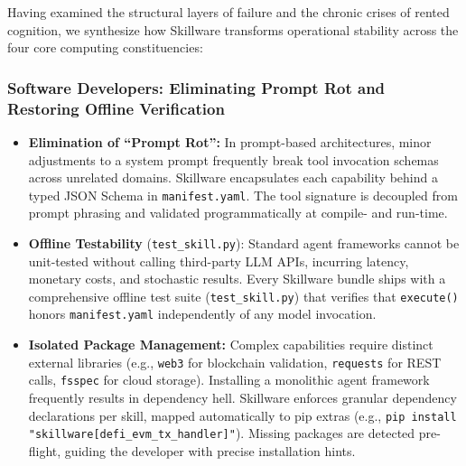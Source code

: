 Having examined the structural layers of failure and the chronic crises of rented cognition, we synthesize how Skillware transforms operational stability across the four core computing constituencies:

\subsubsection{Software Developers: Eliminating Prompt Rot and Restoring Offline Verification}
\begin{itemize}[leftmargin=*]
  \item \textbf{Elimination of ``Prompt Rot'':} In prompt-based architectures, minor adjustments to a system prompt frequently break tool invocation schemas across unrelated domains. Skillware encapsulates each capability behind a typed JSON Schema in \texttt{manifest.yaml}. The tool signature is decoupled from prompt phrasing and validated programmatically at compile- and run-time.
  \item \textbf{Offline Testability} (\texttt{test\_skill.py}): Standard agent frameworks cannot be unit-tested without calling third-party LLM APIs, incurring latency, monetary costs, and stochastic results. Every Skillware bundle ships with a comprehensive offline test suite (\texttt{test\_skill.py}) that verifies that \texttt{execute()} honors \texttt{manifest.yaml} independently of any model invocation.
  \item \textbf{Isolated Package Management:} Complex capabilities require distinct external libraries (e.g., \texttt{web3} for blockchain validation, \texttt{requests} for REST calls, \texttt{fsspec} for cloud storage). Installing a monolithic agent framework frequently results in dependency hell. Skillware enforces granular dependency declarations per skill, mapped automatically to pip extras (e.g., \texttt{pip install "skillware[defi\_evm\_tx\_handler]"}). Missing packages are detected pre-flight, guiding the developer with precise installation hints.
\end{itemize}

